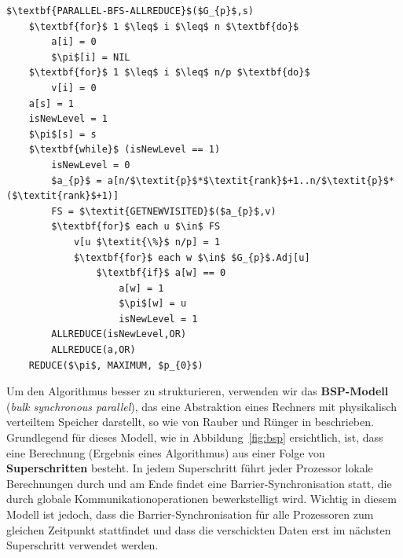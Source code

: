 \documentclass[11pt,a4paper]{article}
\begin{document}
\begin{lstlisting}[caption={Die Prozedur \lstinline{PARALLEL-BFS-ALLREDUCE} wird von allen verfügbaren Prozessoren parallel aufgerufen. Nach jeder Abarbeitung eines Levels findet durch die \lstinline{ALLREDUCE} Operationen eine sogenannte Barrier-Synchronisation statt, bei der zwischen den Prozessoren ausgetauscht wird, ob es überhaupt einen neu besuchten Knoten gibt (\lstinline{isNewLevel}), beziehungsweise wird das Array \lstinline{a} synchronisiert.},label=par_allvisited]
$\textbf{PARALLEL-BFS-ALLREDUCE}$($G_{p}$,s)
	$\textbf{for}$ 1 $\leq$ i $\leq$ n $\textbf{do}$
		a[i] = 0
		$\pi$[i] = NIL
	$\textbf{for}$ 1 $\leq$ i $\leq$ n/p $\textbf{do}$
		v[i] = 0
	a[s] = 1
	isNewLevel = 1
	$\pi$[s] = s
	$\textbf{while}$ (isNewLevel == 1)
		isNewLevel = 0
		$a_{p}$ = a[n/$\textit{p}$*$\textit{rank}$+1..n/$\textit{p}$*($\textit{rank}$+1)]
		FS = $\textit{GETNEWVISITED}$($a_{p}$,v)
		$\textbf{for}$ each u $\in$ FS
			v[u $\textit{\%}$ n/p] = 1
			$\textbf{for}$ each w $\in$ $G_{p}$.Adj[u]
				$\textbf{if}$ a[w] == 0
					a[w] = 1
					$\pi$[w] = u
					isNewLevel = 1
		ALLREDUCE(isNewLevel,OR)
		ALLREDUCE(a,OR)
	REDUCE($\pi$, MAXIMUM, $p_{0}$)
\end{lstlisting}
Um den Algorithmus besser zu strukturieren, verwenden wir das \textbf{BSP-Modell} (\textit{bulk synchronous parallel}), das eine Abstraktion eines Rechners mit physikalisch verteiltem Speicher darstellt, so wie von Rauber und Rünger in \cite{rauber} beschrieben. Grundlegend für dieses Modell, wie in Abbildung~\ref{fig:bsp} ersichtlich, ist, dass eine Berechnung (Ergebnis eines Algorithmus) aus einer Folge von \textbf{Superschritten} besteht. In jedem Superschritt führt jeder Prozessor lokale Berechnungen durch und am Ende findet eine Barrier-Synchronisation statt, die durch globale Kommunikationoperationen bewerkstelligt wird. Wichtig in diesem Modell ist jedoch, dass die Barrier-Synchronisation für alle Prozessoren zum gleichen Zeitpunkt stattfindet und dass die verschickten Daten erst im nächsten Superschritt verwendet werden.
\end{document}
